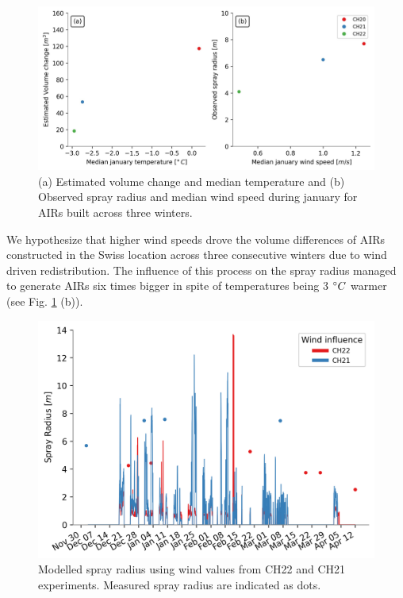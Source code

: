 \begin{figure}[t]
\centering
\includegraphics[width=\textwidth]{Figures/CH_diffs.jpg}
\caption{(a) Estimated volume change and median temperature and (b) Observed spray radius and median wind speed
during january for AIRs built across three winters. } 
\label{fig:CH_diffs}
\end{figure}

We hypothesize that higher wind speeds drove the volume differences of AIRs constructed in the Swiss location
across three consecutive winters due to wind driven redistribution. The influence of this process on the spray
radius managed to generate AIRs six times bigger in spite of temperatures being 3 $^{\circ} C$ warmer (see Fig.
\ref{fig:CH_diffs} (b)). 

\begin{figure}[t]
\includegraphics[width=12 cm]{Figures/radf.png}
\caption{Modelled spray radius using wind values from CH22 and CH21 experiments. Measured spray radius are
indicated as dots.}
\label{fig:wind}
\end{figure}

